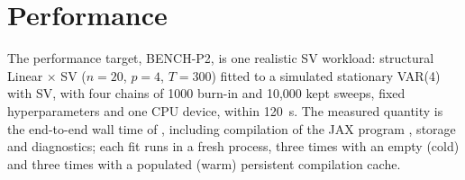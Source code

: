 \section{Performance}\label{sec:performance}


The performance target, BENCH-P2, is one realistic SV workload: structural Linear $\times$ SV ($n = 20$, $p = 4$, $T = 300$) fitted to a simulated stationary VAR(4) with SV, with four chains of 1000 burn-in and 10,000 kept sweeps, fixed hyperparameters and one CPU device, within 120~s. %
The measured quantity is the end-to-end wall time of , including compilation of the JAX program \citep{bradbury2018jax}, storage and diagnostics; each fit runs in a fresh process, three times with an empty (cold) and three times with a populated (warm) persistent compilation cache. %

